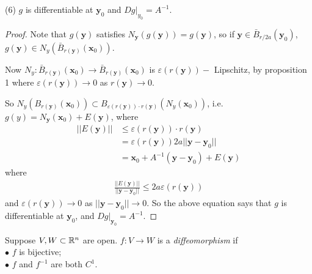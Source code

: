 \documentclass[a4paper]{article}
\begin{document}
\begin{prop}(6)
$g$ is differentiable at $\mathbf{y}_0$ and $Dg|_{y_0} = A^{-1}$.
\begin{proof}
Note that $g\left(\mathbf{y}\right)$ satisfies $N_\mathbf{y}\left(g\left(\mathbf{y}\right)\right) = g\left(\mathbf{y}\right)$, so if $\mathbf{y} \in \bar{B}_{r/2a}\left(\mathbf{y}_0\right)$, $g\left(\mathbf{y}\right) \in N_y\left(\bar{B}_{r\left(\mathbf{y}\right)} \left(\mathbf{x}_0\right)\right)$.

Now $N_y: \bar{B}_{r(\mathbf{y})} \left(\mathbf{x}_0\right) \to \bar{B}_{r(\mathbf{y})} \left(\mathbf{x}_0\right)$ is $\varepsilon\left(r\left(\mathbf{y}\right)\right)-$ Lipschitz, by proposition 1 where $\varepsilon\left(r\left(\mathbf{y}\right)\right) \to 0$ as $r\left(\mathbf{y}\right) \to 0$.

So $N_y\left(B_{r(\mathbf{y})} \left(\mathbf{x}_0\right)\right) \subset B_{\varepsilon(r(\mathbf{y})) \cdot r(\mathbf{y})}\left(N_y\left(\mathbf{x}_0\right)\right)$, i.e. $g\left(y\right) = N_\mathbf{y}\left(\mathbf{x}_0\right) + E\left(\mathbf{y}\right)$, where 
\begin{equation*}
\begin{aligned}
||E\left(\mathbf{y}\right)|| &\leq \varepsilon(r(\mathbf{y})) \cdot r(\mathbf{y}) 
\\&= \varepsilon(r(\mathbf{y}))2a||\mathbf{y}-\mathbf{y}_0||\\
&=\mathbf{x}_0+A^{-1}\left(\mathbf{y}-\mathbf{y}_0\right) + E\left(\mathbf{y}\right)
\end{aligned}
\end{equation*}
where 
\begin{equation*}
\begin{aligned}
\frac{||E\left(\mathbf{y}\right)||}{||\mathbf{y}-\mathbf{y}_0||} \leq 2a\varepsilon(r(\mathbf{y}))
\end{aligned}
\end{equation*}
and $\varepsilon(r(\mathbf{y})) \to 0$ as $||\mathbf{y}-\mathbf{y}_0|| \to 0$. So the above equation says that $g$ is differentiable at $\mathbf{y}_0$, and $Dg|_{\mathbf{y}_0} = A^{-1}$.
\end{proof}
\end{prop}

\begin{defi}
Suppose $V,W \subset \mathbb{R}^n$ are open. $f:V \to W$ is a \emph{diffeomorphism} if\\
$\bullet$ $f$ is bijective;\\
$\bullet$ $f$ and $f^{-1}$ are both $C^1$.
\end{defi}
\end{document}
